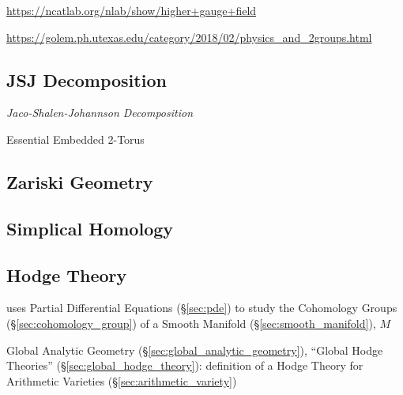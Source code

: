 \url{https://ncatlab.org/nlab/show/higher+gauge+field}

\url{https://golem.ph.utexas.edu/category/2018/02/physics_and_2groups.html}



\subsection{JSJ Decomposition}\label{sec:jsj_decomposition}

\emph{Jaco-Shalen-Johannson Decomposition}

Essential Embedded 2-Torus



\subsection{Zariski Geometry}\label{sec:zariski_geometry}

\subsection{Simplical Homology}\label{sec:simplical_homology}

\subsection{Hodge Theory}\label{sec:hodge_theory}

uses Partial Differential Equations (\S\ref{sec:pde}) to study the Cohomology
Groups (\S\ref{sec:cohomology_group}) of a Smooth Manifold
(\S\ref{sec:smooth_manifold}), $M$

\fist Global Analytic Geometry (\S\ref{sec:global_analytic_geometry}), ``Global
Hodge Theories'' (\S\ref{sec:global_hodge_theory}): definition of a Hodge
Theory for Arithmetic Varieties (\S\ref{sec:arithmetic_variety})



